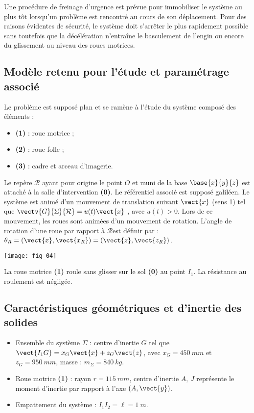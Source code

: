 \begin{multicols}{2}
Une procédure de freinage d’urgence est prévue pour immobiliser le système au plus tôt lorsqu’un
problème est rencontré au cours de son déplacement. Pour des raisons évidentes de sécurité, le système
doit s’arrêter le plus rapidement possible sans toutefois que la décélération n’entraîne le basculement
de l’engin ou encore du glissement au niveau des roues motrices.


\subsection*{Modèle retenu pour l’étude et paramétrage associé}

Le problème est supposé plan et se ramène à l’étude
du système composé des éléments :
\begin{itemize}
\item \textbf{(1)} : roue motrice ;
\item \textbf{(2)} : roue folle ;
\item \textbf{(3)} : cadre et arceau d’imagerie.
\end{itemize}
Le repère $\mathcal{R}$ ayant pour origine le point $O$ et muni de la
base $\base{x}{y}{z}$ est attaché à la salle d’intervention \textbf{(0)}.
Le référentiel associé est supposé galiléen.
Le système est animé d’un mouvement de translation
suivant $\vect{x}$ (sens 1) tel que $\vectv{G}{\Sigma}{\mathcal{R}}= u(t)\vect{x}$ , avec
$u(t) > 0$.
Lors de ce mouvement, les roues sont animées d’un
mouvement de rotation. L’angle de rotation d’une roue
par rapport à 
$\mathcal{R}$est définir par :
$\theta_R = \left(\vect{x},\vect{x_R}\right) = \left(\vect{z},\vect{z_R}\right)$.

\begin{center}
\texttt{[image: fig\_04]}
\end{center}



\begin{hypo}
La roue motrice \textbf{(1)} roule sans glisser sur le sol \textbf{(0)} au point $I_1$.
La résistance au roulement est négligée.
\end{hypo}

\subsection*{Caractéristiques géométriques et d’inertie des solides}
\begin{itemize}
\item Ensemble du système $\Sigma$ : centre d’inertie $G$ tel que $\vect{I_1G} = x_G \vect{x} +z_G \vect{z}$, avec $x_G=\SI{450}{mm}$ et $z_G=\SI{950}{mm}$, masse : $m_{\Sigma}=\SI{840}{kg}$.
\item Roue motrice \textbf{(1)} : rayon $r = \SI{115}{mm}$, centre d'inertie $A$,  $J$ représente le moment d’inertie par rapport à l’axe $\left(A,\vect{y}\right)$.
\item Empattement du système : $I_1I_2 =\ell  = \SI{1}{m}$.
\end{itemize}


\end{multicols}
